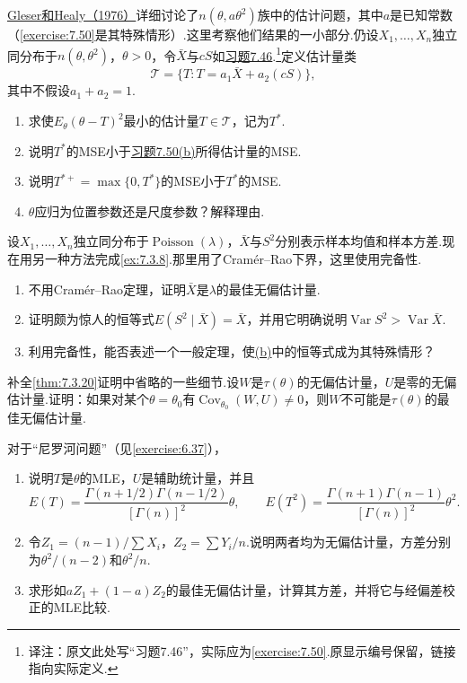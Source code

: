 \begin{exercise}\label{exercise:7.51}
\hyperref[bib:source149]{Gleser和Healy（1976）}详细讨论了$n(\theta,a\theta^2)$族中的估计问题，其中$a$是已知常数（\autoref{exercise:7.50}是其特殊情形）.这里考察他们结果的一小部分.仍设$X_1,\ldots,X_n$独立同分布于$n(\theta,\theta^2)$，$\theta>0$，令$\bar X$与$cS$如\hyperref[exercise:7.50]{习题7.46}.\footnote{译注：原文此处写“习题7.46”，实际应为\autoref{exercise:7.50}.原显示编号保留，链接指向实际定义.}定义估计量类
$$\mathcal T=\{T:T=a_1\bar X+a_2(cS)\},$$
其中不假设$a_1+a_2=1$.
\begin{enumerate}[label=(\alph*)]
\item 求使$E_\theta(\theta-T)^2$最小的估计量$T\in\mathcal T$，记为$T^*$.
\item 说明$T^*$的MSE小于\hyperref[exercise:7.50]{习题7.50(b)}所得估计量的MSE.
\item 说明$T^{*+}=\max\{0,T^*\}$的MSE小于$T^*$的MSE.
\item $\theta$应归为位置参数还是尺度参数？解释理由.
\end{enumerate}
\end{exercise}
\begin{exercise}\label{exercise:7.52}
设$X_1,\ldots,X_n$独立同分布于$\operatorname{Poisson}(\lambda)$，$\bar X$与$S^2$分别表示样本均值和样本方差.现在用另一种方法完成\autoref{ex:7.3.8}.那里用了Cramér--Rao下界，这里使用完备性.
\begin{enumerate}[label=(\alph*)]
\item 不用Cramér--Rao定理，证明$\bar X$是$\lambda$的最佳无偏估计量.
\item{}\label{itm:exercise:7.52:b} 证明颇为惊人的恒等式$E(S^2\mid\bar X)=\bar X$，并用它明确说明$\operatorname{Var}S^2>\operatorname{Var}\bar X$.
\item 利用完备性，能否表述一个一般定理，使\hyperref[itm:exercise:7.52:b]{(b)}中的恒等式成为其特殊情形？
\end{enumerate}
\end{exercise}
\begin{exercise}\label{exercise:7.53}
补全\autoref{thm:7.3.20}证明中省略的一些细节.设$W$是$\tau(\theta)$的无偏估计量，$U$是零的无偏估计量.证明：如果对某个$\theta=\theta_0$有$\operatorname{Cov}_{\theta_0}(W,U)\ne0$，则$W$不可能是$\tau(\theta)$的最佳无偏估计量.
\end{exercise}
\begin{exercise}\label{exercise:7.54}
对于“尼罗河问题”（见\autoref{exercise:6.37}），
\begin{enumerate}[label=(\alph*)]
\item 说明$T$是$\theta$的MLE，$U$是辅助统计量，并且
$$E(T)=\frac{\Gamma(n+1/2)\Gamma(n-1/2)}{[\Gamma(n)]^2}\theta,\qquad E(T^2)=\frac{\Gamma(n+1)\Gamma(n-1)}{[\Gamma(n)]^2}\theta^2.$$
\item 令$Z_1=(n-1)/\sum X_i$，$Z_2=\sum Y_i/n$.说明两者均为无偏估计量，方差分别为$\theta^2/(n-2)$和$\theta^2/n$.
\item 求形如$aZ_1+(1-a)Z_2$的最佳无偏估计量，计算其方差，并将它与经偏差校正的MLE比较.
\end{enumerate}
\end{exercise}
